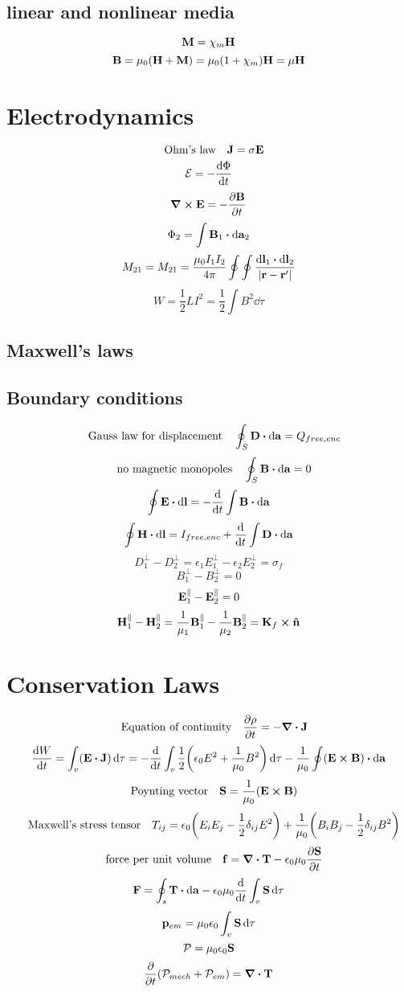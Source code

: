 \documentclass[12pt]{article}
\begin{document}
\subsection*{linear and nonlinear media}
\[\vb{M}=\chi_m\vb{H}\]
\[\vb{B}=\mu_0(\vb{H}+\vb{M})=\mu_0(1+\chi_m)\vb{H}=\mu\vb{H}\]
\section{Electrodynamics}
\[\qq{Ohm's law} \vb{J}=\sigma\vb{E}\]
\[\mathcal{E}=-\dv{\Phi}{t}\]
\[\curl{\vb{E}}=-\pdv{\vb{B}}{t}\]
\[\Phi_2=\int\vb{B}_1\vdot\dd{\vb{a}_2}\]
\[M_{21}=M_{21}=\frac{\mu_0I_1I_2}{4\pi}\oint\oint\frac{\dd{\vb{l}_1}\vdot\dd{\vb{l}_2}}{|\vb{r}-\vb{r}' |}\]
\[W=\frac{1}{2}LI^2=\frac{1}{2}\int B^2\dd{\tau}\]
\subsection*{Maxwell's laws}

\subsection*{Boundary conditions}
\[\qq{Gauss law for displacement}\oint_{S}\vb{D}\vdot\dd{\vb{a}}=Q_{free,enc}\]
\[\qq{no magnetic monopoles}\oint_{S}\vb{B}\vdot\dd{\vb{a}}=0\]
\[\oint\vb{E}\vdot\dd{\vb{l}}=-\dv{t}\int\vb{B}\vdot\dd{\vb{a}}\]
\[\oint\vb{H}\vdot\dd{\vb{l}}=I_{free,enc}+\dv{t}\int\vb{D}\vdot\dd{\vb{a}}\]
\[D_{1}^{\perp}-D_{2}^{\perp}=\epsilon_1E_{1}^{\perp}-\epsilon_2E_{2}^{\perp}=\sigma_f\]
\[B_{1}^{\perp}-B_{2}^{\perp}=0\]
\[\vb{E}_{1}^{\parallel}-\vb{E}_{2}^{\parallel}=0\]
\[\vb{H}_{1}^{\parallel}-\vb{H}_{2}^{\parallel}=\frac{1}{\mu_1}\vb{B}_{1}^{\parallel}-\frac{1}{\mu_2}\vb{B}_{2}^{\parallel}=\vb{K}_f\cp\vu{n}\]

\section{Conservation Laws}
\[\qq{Equation of continuity} \pdv{\rho}{t}=-\div{\vb{J}}\]
\[\dv{W}{t}=\int_{v}(\vb{E}\vdot{\vb{J}})\dd{\tau}=-\dv{t}\int_{v}\frac{1}{2}\qty(\epsilon_0E^2+\frac{1}{\mu_0}B^2)\dd{\tau}-\frac{1}{\mu_0}\oint(\vb{E}\cp\vb{B})\vdot\dd{\vb{a}}\]
\[\qq{Poynting vector}\vb{S}=\frac{1}{\mu_0}(\vb{E}\cp\vb{B})\]
\[\qq{Maxwell's stress tensor} T_{ij}=\epsilon_0\qty(E_iE_j-\frac{1}{2}\delta_{ij}E^2)+\frac{1}{\mu_0}\qty(B_iB_j-\frac{1}{2}\delta_{ij}B^2)\]
\[\qq{force per unit volume} \vb{f}=\div{\vb{T}}-\epsilon_0\mu_0\pdv{\vb{S}}{t}\]
\[\vb{F}=\oint_s\vb{T}\vdot\dd{\vb{a}}-\epsilon_0\mu_0\dv{t}\int_v\vb{S}\dd{\tau}\]
\[\vb{p}_{em}=\mu_0\epsilon_0\int_v\vb{S}\dd{\tau}\]
\[\mathcal{P}=\mu_0\epsilon_0\vb{S}\]
\[\pdv{t}(\mathcal{P}_{mech}+\mathcal{P}_{em})=\div{\vb{T}}\]
\end{document}
